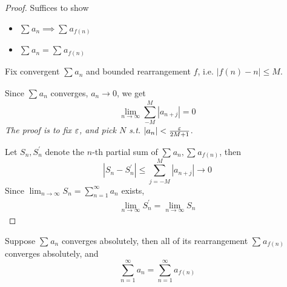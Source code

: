 \begin{proof}
    Suffices to show 
    \begin{itemize}
        \item $\sum\limits_{}^{} a_n \implies \sum\limits_{}^{} a_{f(n)}$
        \item $\sum\limits_{}^{} a_n = \sum\limits_{}^{} a_{f(n)}$
    \end{itemize} 
    Fix convergent $\sum\limits_{}^{} a_n$ and 
    bounded rearrangement $f$, i.e. $|f(n) - n| \leq M$.
    \medskip

    Since $\sum\limits_{} a_n $ converges, $a_n \to 0$, we get 
    \[
        \lim_{n \to \infty} \sum\limits_{-M}^{M}  |a_{n +j }| = 0
    \]
    \textit{The proof is to fix $\varepsilon$, and pick $N$ s.t. $|a_n| < \frac{\varepsilon}{2M + 1}$}.
    \medskip

    Let $S_n, S_n^{\prime}$ denote the $n$-th partial sum 
    of $\sum\limits_{}^{} a_n, \sum\limits_{}^{} a_{f(n)}$,
    then 
    \[
        \left| S_n - S_n^{\prime} \right|  \leq \sum\limits_{j = -M}^{M} |a_{n + j}|
        \to 0
    \]
    Since $\lim_{n \to \infty}S_n = \sum\limits_{n=1}^{\infty} a_n$ exists,
    \begin{align*}
        \lim_{n \to \infty}S_n^{\prime} = 
        \lim_{n \to \infty}S_n
    \end{align*}

\end{proof}

\begin{theorem}
    Suppose $\sum\limits_{}^{} a_n$ converges absolutely,
    then all of its rearrangement $\sum\limits_{}^{} a_{f(n)}$
    converges absolutely, and 
    \[
        \sum\limits_{n=1}^{\infty} a_n 
        =
        \sum\limits_{n=1}^{\infty} a_{f(n)} 
    \]
\end{theorem}

